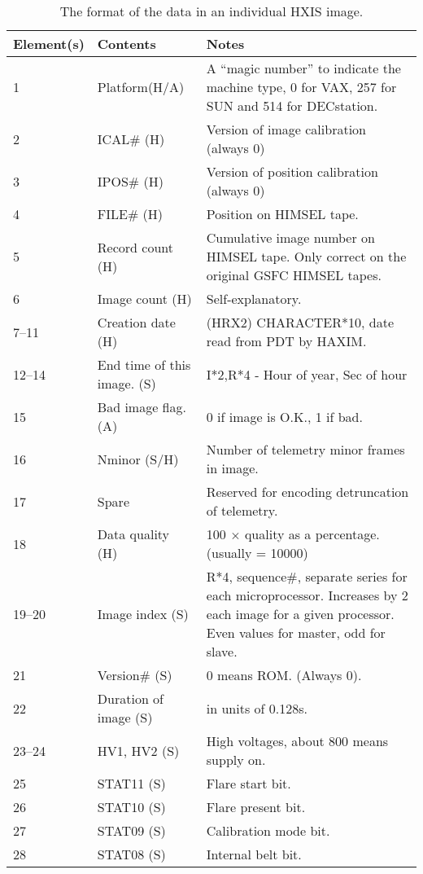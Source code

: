 \begin{table}
\begin{center}
\caption{\label{data} The format of the data in an individual HXIS image.}
{\small
\begin{tabular}{|llp{75mm}|} \hline
Element(s) & Contents &  Notes \\
\hline
1 & Platform\hfill(H/A) & A ``magic number'' to indicate the machine
type, 0 for VAX, 257 for SUN and 514 for DECstation. \\
2 & ICAL\# \hfill(H) & Version of image calibration (always 0)\\
3 & IPOS\# \hfill(H) & Version of position calibration (always 0)\\
4 & FILE\# \hfill(H) & Position on HIMSEL tape.\\
5 & Record count \hfill(H) & Cumulative image number on HIMSEL tape. Only correct on the
original GSFC HIMSEL tapes.\\
6 & Image count \hfill(H) & Self-explanatory. \\
7--11 & Creation date \hfill(H) & (HRX2) CHARACTER*10, date read from PDT by HAXIM.\\
12--14 & End time of this image. \hfill(S) & I*2,R*4 - Hour of year, Sec of hour\\
15 & Bad image flag. \hfill(A) & 0 if image is O.K., 1 if bad.\\
16 & Nminor \hfill(S/H) & Number of telemetry minor frames in image.\\
17 & Spare & Reserved for encoding detruncation of telemetry.\\
18 & Data quality \hfill(H) & 100 $\times$ quality as a percentage. (usually 
= 10000)\\
19--20 & Image index \hfill(S) & R*4, sequence\#, separate series for each 
microprocessor.
Increases by 2 each image for a given processor. Even values for master, 
odd for slave.\\
21 & Version\# \hfill(S) & 0 means ROM. (Always 0). \\
22 & Duration of image \hfill(S) & in units of 0.128s.\\
23--24 & HV1, HV2 \hfill(S) & High voltages, about 800 means supply on.\\
25 & STAT11 \hfill (S) & Flare start bit. \\
26 & STAT10 \hfill (S) & Flare present bit. \\
27 & STAT09 \hfill (S) & Calibration mode bit. \\
28 & STAT08 \hfill (S) & Internal belt bit. \\

\end{tabular}}
\end{center}
\end{table}
